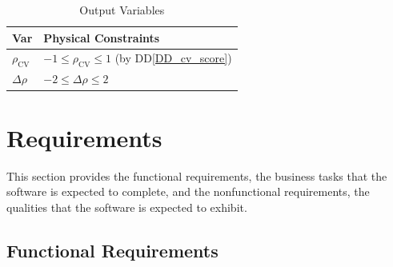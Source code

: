 \documentclass[12pt]{article}
\begin{document}
\renewcommand{\arraystretch}{1.2}
\begin{longtable}{l l}
\caption{Output Variables}\label{TblOutputVar}\\
  \toprule
  \textbf{Var} & \textbf{Physical Constraints} \\
  \midrule
  $\rho_{\mathrm{CV}}$ & $-1 \le \rho_{\mathrm{CV}} \le 1$ (by DD\ref{DD_cv_score})\\
  $\Delta \rho$ & $-2 \le \Delta \rho \le 2$\\
  \bottomrule
\end{longtable}






\section{Requirements} \label{Requirements}


This section provides the functional requirements, the business tasks that the
software is expected to complete, and the nonfunctional requirements, the
qualities that the software is expected to exhibit.



\subsection{Functional Requirements}

\noindent 
\end{document}
